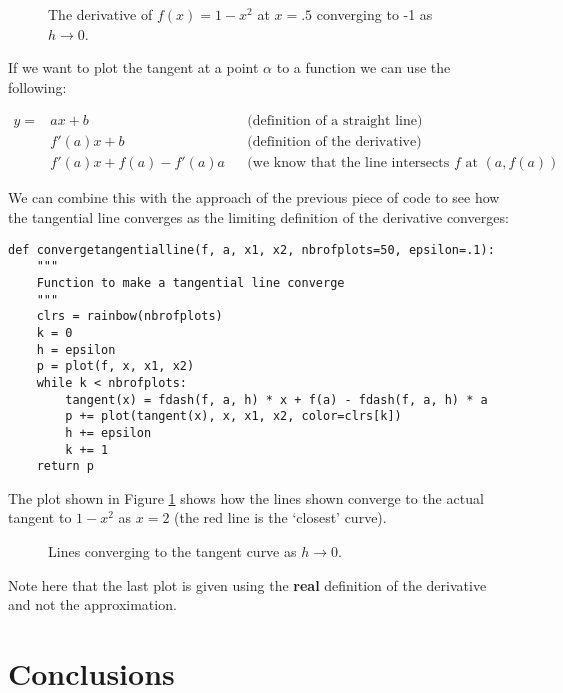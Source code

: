 \documentclass[a4paper]{article}
\begin{document}
\begin{figure}[!htbp]
\begin{center}
\end{center}
\caption{The derivative of $f(x)=1-x^2$ at $x=.5$ converging to -1 as $h\to0$.}
\end{figure}

If we want to plot the tangent at a point $\alpha$ to a function we can use the following:

\begin{align}
y=&ax+b&&\text{(definition of a straight line)}\nonumber\\
  &f'(a)x+b&&\text{(definition of the derivative)}\nonumber\\
  &f'(a)x+f(a)-f'(a)a&&\text{(we know that the line intersects $f$ at $(a,f(a))$}\nonumber
\end{align}

We can combine this with the approach of the previous piece of code to see how the tangential line converges as the limiting definition of the derivative converges:

\begin{verbatim}
def convergetangentialline(f, a, x1, x2, nbrofplots=50, epsilon=.1):
    """
    Function to make a tangential line converge
    """
    clrs = rainbow(nbrofplots)
    k = 0
    h = epsilon
    p = plot(f, x, x1, x2)
    while k < nbrofplots:
        tangent(x) = fdash(f, a, h) * x + f(a) - fdash(f, a, h) * a
        p += plot(tangent(x), x, x1, x2, color=clrs[k])
        h += epsilon
        k += 1
    return p
\end{verbatim}

The plot shown in Figure \ref{lines} shows how the lines shown converge to the actual tangent to $1-x^2$ as $x=2$ (the red line is the `closest' curve).

\begin{figure}[!htbp]
\begin{center}
\end{center}
\caption{Lines converging to the tangent curve as $h\to0$.}\label{lines}
\end{figure}

Note here that the last plot is given using the \textbf{real} definition of the derivative and not the approximation.

\section{Conclusions}
\end{document}
